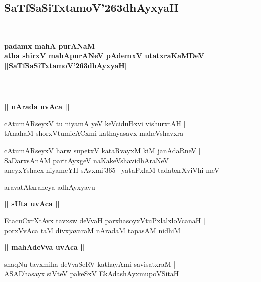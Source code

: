 \documentclass[twoside,12pt,openright]{book}
\def\S{\char'263}
\newcounter{shloka}[chapter]
\def\uvaca#1{\centerline{{\large\textbf{#1}}}}
\begin{document}

\frontmatter

\tableofcontents

\mainmatter
\begin{center}
\chapter{SaTfSaSiTxtamoV\S dhAyxyaH}
\end{center}

\begin{center}
\rule{2cm}{1pt}\\[.5cm]
{\huge\bfseries  padamx mahA purANaM}\\[.3cm]
{\Large\bfseries  atha shirxV mahApurANeV pAdemxV utatxraKaMDeV }\\[.3cm]
{\LARGE\bfseries ||SaTfSaSiTxtamoV\S dhAyxyaH||}\\[.3cm]
\rule{2cm}{1pt}\\
\end{center}

\uvaca{|| nArada uvAca ||}

\begin{shloka}%
cAtumARseyxV tu niyamA yeV keVciduBxvi vishurxtAH | \\
tAnahaM shorxVtumicACxmi kathayasavx maheVshavxra
\end{shloka}

\begin{shloka}%
cAtumARseyxV harw supetxV kataRvayxM kiM janAdaRneV |\\
SaDarxsAnAM paritAyxgeV naKakeVshavidhAraNeV ||\\
aneyxYshacx niyameYH sAvxmi\char'365 ~yataPxlaM tadabxrXviVhi meV
\end{shloka}

\begin{center}
aravatAtxraneya adhAyxyavu
\end{center}

\uvaca{|| sUta uvAca ||}

\begin{shloka}%
EtacuCxrXtAvx tavxsw deVvaH parxhasoyxVtuPxlalxloVcanaH |\\
porxVvAca taM divxjavaraM nAradaM tapasAM nidhiM 
\end{shloka}

\uvaca{|| mahAdeVva uvAca ||}

\begin{shloka}%
shaqNu tavxmiha deVvaSeRV kathayAmi savisatxraM |\\
ASADhasayx siVteV pakeSxV EkAdashAyxmupoVSitaH 
\end{shloka}
\end{document}
